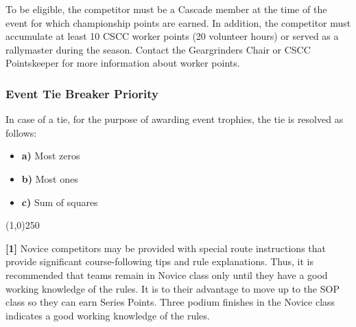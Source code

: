 To be eligible, the competitor must be a Cascade member at the time of the event for which championship points are earned. In addition, the competitor must accumulate at least 10 CSCC worker points (20 volunteer hours) or served as a rallymaster during the season. Contact the Geargrinders Chair or CSCC Pointskeeper for more information about worker points.

\subsubsection{Event Tie Breaker Priority}
In case of a tie, for the purpose of awarding event trophies, the tie is resolved as follows:
\begin{itemize}
\item \textbf{a)} Most zeros
\item \textbf{b)} Most ones
\item \textbf{c)} Sum of squares
\end{itemize}

\begin{center}
\line(1,0){250}
\end{center}
\textbf{[1]} Novice competitors may be provided with special route instructions that provide significant course-following tips and rule explanations. Thus, it is recommended that teams remain in Novice class only until they have a good working knowledge of the rules. It is to their advantage to move up to the SOP class so they can earn Series Points. Three podium finishes in the Novice class indicates a good working knowledge of the rules.
